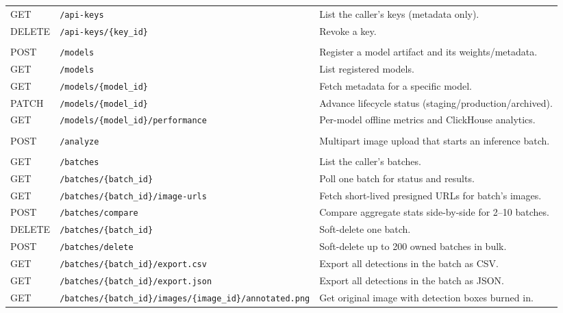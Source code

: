 \begin{singlespace}
\begin{longtable}{@{}l l p{6.4cm}@{}}
GET    & \texttt{/api-keys}             & List the caller's keys (metadata only). \\
DELETE & \texttt{/api-keys/\{key\_id\}}  & Revoke a key. \\
\addlinespace
\multicolumn{3}{@{}l}{\textbf{models}}\\
POST   & \texttt{/models}                       & Register a model artifact and its weights/metadata. \\
GET    & \texttt{/models}                       & List registered models. \\
GET    & \texttt{/models/\{model\_id\}}         & Fetch metadata for a specific model. \\
PATCH  & \texttt{/models/\{model\_id\}}         & Advance lifecycle status (staging/production/archived). \\
GET    & \texttt{/models/\{model\_id\}/performance} & Per-model offline metrics and ClickHouse analytics. \\
\addlinespace
\multicolumn{3}{@{}l}{\textbf{analyze}}\\
POST   & \texttt{/analyze}              & Multipart image upload that starts an inference batch. \\
\addlinespace
\multicolumn{3}{@{}l}{\textbf{batches}}\\
GET    & \texttt{/batches}                       & List the caller's batches. \\
GET    & \texttt{/batches/\{batch\_id\}}          & Poll one batch for status and results. \\
GET    & \texttt{/batches/\{batch\_id\}/image-urls} & Fetch short-lived presigned URLs for batch's images. \\
POST   & \texttt{/batches/compare}               & Compare aggregate stats side-by-side for 2--10 batches. \\
DELETE & \texttt{/batches/\{batch\_id\}}          & Soft-delete one batch. \\
POST   & \texttt{/batches/delete}                & Soft-delete up to 200 owned batches in bulk. \\
GET    & \texttt{/batches/\{batch\_id\}/export.csv}  & Export all detections in the batch as CSV. \\
GET    & \texttt{/batches/\{batch\_id\}/export.json} & Export all detections in the batch as JSON. \\
GET    & \texttt{/batches/\{batch\_id\}/images/\{image\_id\}/annotated.png} & Get original image with detection boxes burned in. \\

\end{longtable}
\end{singlespace}
